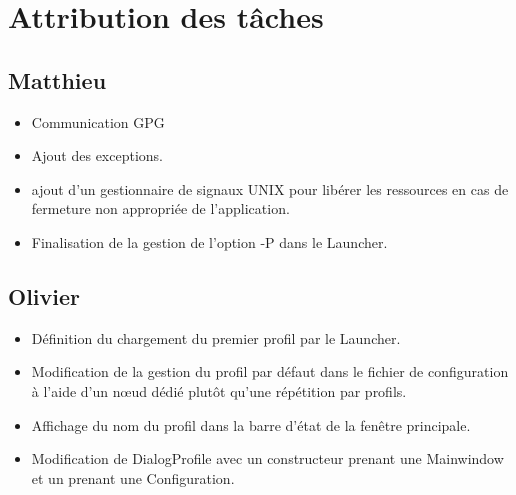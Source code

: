 \documentclass{../../res/CR-projet}
\begin{document}
\begin{center}
\end{center}

\section{Attribution des tâches}

\subsection{Matthieu}

\begin{itemize}
  \item Communication GPG
  \item Ajout des exceptions.
  \item ajout d'un gestionnaire de signaux UNIX pour libérer les ressources en cas de fermeture non appropriée de l'application.
  \item Finalisation de la gestion de l'option -P dans le Launcher.
\end{itemize}

\subsection{Olivier}

\begin{itemize}
  \item Définition du chargement du premier profil par le Launcher.
  \item Modification de la gestion du profil par défaut dans le fichier de configuration
  à l'aide d'un nœud dédié plutôt qu'une répétition par profils.
  \item Affichage du nom du profil dans la barre d'état de la fenêtre principale.
  \item Modification de DialogProfile avec un constructeur prenant une Mainwindow
  et un prenant une Configuration.
\end{itemize}
\end{document}
